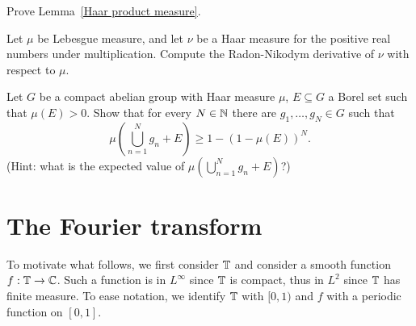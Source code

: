 \begin{exercise}\label{Haar product measure exercise}
Prove Lemma~\ref{Haar product measure}.
\end{exercise}

\begin{exercise}
Let $\mu$ be Lebesgue measure, and let $\nu$ be a Haar measure for the positive real numbers under multiplication.
Compute the Radon-Nikodym derivative of $\nu$ with respect to $\mu$.
\end{exercise}

\begin{exercise}
Let $G$ be a compact abelian group with Haar measure $\mu$, $E \subseteq G$ a Borel set such that $\mu(E) > 0$.
Show that for every $N \in \mathbb{N}$ there are $g_1, \dots, g_{N} \in G$ such that
\[\mu\left(\bigcup_{n=1}^{N} g_{n} + E\right) \geq 1 - (1 - \mu(E))^N.\]
(Hint: what is the expected value of $\mu\left(\bigcup_{n=1}^{N} g_{n} + E\right)$?)
\end{exercise}

\section{The Fourier transform}
To motivate what follows, we first consider $\mathbb{T}$ and consider a smooth function $f: \mathbb{T} \to \mathbb{C}$.
Such a function is in $L^\infty$ since $\mathbb{T}$ is compact, thus in $L^2$ since $\mathbb{T}$ has finite measure.
To ease notation, we identify $\mathbb{T}$ with $[0, 1)$ and $f$ with a periodic function on $[0, 1]$.

